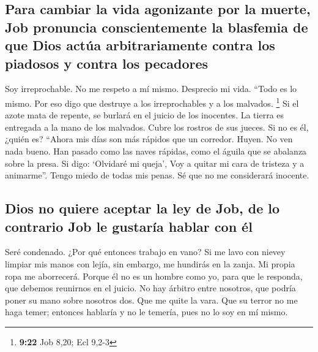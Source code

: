 \begin{paracol}{2}
\hypertarget{para-cambiar-la-vida-agonizante-por-la-muerte-job-pronuncia-conscientemente-la-blasfemia-de-que-dios-actuxfaa-arbitrariamente-contra-los-piadosos-y-contra-los-pecadores}{%
\subsection{Para cambiar la vida agonizante por la muerte, Job pronuncia
conscientemente la blasfemia de que Dios actúa arbitrariamente contra
los piadosos y contra los
pecadores}\label{para-cambiar-la-vida-agonizante-por-la-muerte-job-pronuncia-conscientemente-la-blasfemia-de-que-dios-actuxfaa-arbitrariamente-contra-los-piadosos-y-contra-los-pecadores}}

 Soy irreprochable. No me respeto a mí mismo. Desprecio
mi vida.  ``Todo es lo mismo. Por eso digo que destruye a
los irreprochables y a los malvados. \footnote{\textbf{9:22} Job 8,20;
  Ecl 9,2-3}  Si el azote mata de repente, se burlará en
el juicio de los inocentes.  La tierra es entregada a la
mano de los malvados. Cubre los rostros de sus jueces. Si no es él,
¿quién es?  ``Ahora mis días son más rápidos que un
corredor. Huyen. No ven nada bueno.  Han pasado como las
naves rápidas, como el águila que se abalanza sobre la presa.
 Si digo: `Olvidaré mi queja', Voy a quitar mi cara de
tristeza y a animarme''.  Tengo miedo de todas mis penas.
Sé que no me considerará inocente.

\hypertarget{dios-no-quiere-aceptar-la-ley-de-job-de-lo-contrario-job-le-gustaruxeda-hablar-con-uxe9l}{%
\subsection{Dios no quiere aceptar la ley de Job, de lo contrario Job le
gustaría hablar con
él}\label{dios-no-quiere-aceptar-la-ley-de-job-de-lo-contrario-job-le-gustaruxeda-hablar-con-uxe9l}}

 Seré condenado. ¿Por qué entonces trabajo en vano?
 Si me lavo con nievey limpiar mis manos con lejía,
 sin embargo, me hundirás en la zanja. Mi propia ropa me
aborrecerá.  Porque él no es un hombre como yo, para que
le responda, que debemos reunirnos en el juicio.  No hay
árbitro entre nosotros, que podría poner su mano sobre nosotros dos.
 Que me quite la vara. Que su terror no me haga temer;
 entonces hablaría y no le temería, pues no lo soy en mí
mismo.


\end{paracol}
